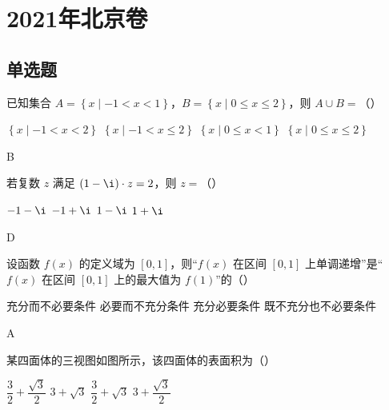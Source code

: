 \chapter{2021年北京卷}

\section{单选题}

\begin{problem}
已知集合 \(A=\left\{x\mid -1<x<1\right\}\)，\(B=\left\{x\mid 0\le x\le2\right\}\)，则 \(A\cup B=\)（\quad）

\choices
    {\(\left\{x\mid -1<x<2\right\}\)}
    {\(\left\{x\mid -1<x\le2\right\}\)}
    {\(\left\{x\mid 0\le x<1\right\}\)}
    {\(\left\{x\mid 0\le x\le2\right\}\)}
\end{problem}

\begin{answer}
B
\end{answer}

\begin{problem}
若复数 \(z\) 满足 \((1-\i)\cdot z=2\)，则 \(z=\)（\quad）

\choices
    {\(-1-\i\)}
    {\(-1+\i\)}
    {\(1-\i\)}
    {\(1+\i\)}
\end{problem}

\begin{answer}
D
\end{answer}

\begin{problem}
设函数 \(f(x)\) 的定义域为 \([0,1]\)，则“\(f(x)\) 在区间 \([0,1]\) 上单调递增”是“\(f(x)\) 在区间 \([0,1]\) 上的最大值为 \(f(1)\)”的（\quad）

\choices
    {充分而不必要条件}
    {必要而不充分条件}
    {充分必要条件}
    {既不充分也不必要条件}
\end{problem}

\begin{answer}
A
\end{answer}

\begin{problem}
某四面体的三视图如图所示，该四面体的表面积为（\quad）


\choices
    {\(\dfrac{3}{2}+\dfrac{\sqrt3}{2}\)}
    {\(3+\sqrt3\)}
    {\(\dfrac{3}{2}+\sqrt3\)}
    {\(3+\dfrac{\sqrt3}{2}\)}
\end{problem}

